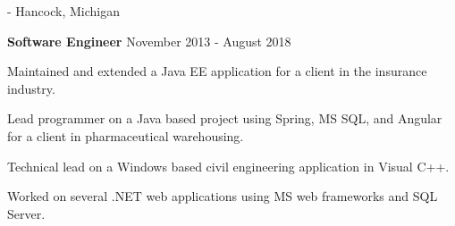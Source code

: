 { - Hancock, Michigan
\begin{outerlist}
\item[] \textbf{Software Engineer} \hfill  November 2013 - August 2018
 \begin{innerlist}
  \item Maintained and extended a Java EE application for a client in the insurance industry.
  \item Lead programmer on a Java based project using Spring, MS SQL, and Angular for a client in pharmaceutical warehousing.
  \item Technical lead on a Windows based civil engineering application in Visual C++.  
  \item Worked on several .NET web applications using MS web frameworks and SQL Server.
 \end{innerlist}
\end{outerlist}
\blankline
}

